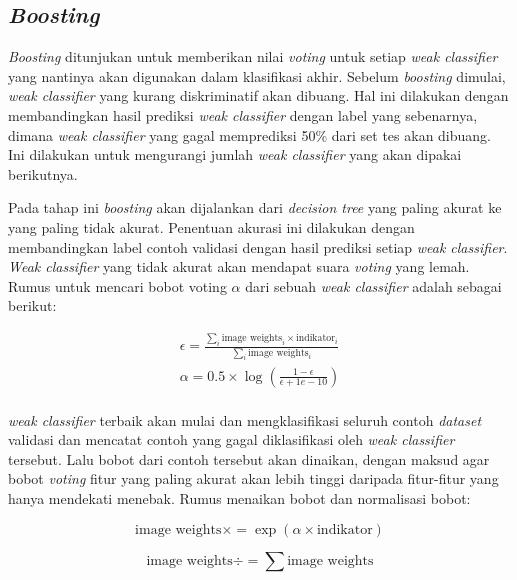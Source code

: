\subsection{\emph{Boosting}}

\emph{Boosting} ditunjukan untuk memberikan nilai \emph{voting} untuk setiap \textit{weak classifier} 
yang nantinya akan digunakan dalam klasifikasi akhir. Sebelum \emph{boosting} dimulai, 
\textit{weak classifier} yang kurang diskriminatif akan dibuang. Hal ini dilakukan dengan 
membandingkan hasil prediksi \textit{weak classifier} dengan label yang sebenarnya, dimana 
\textit{weak classifier} yang gagal memprediksi 50\% dari set tes akan dibuang. Ini dilakukan 
untuk mengurangi jumlah \textit{weak classifier} yang akan dipakai berikutnya.

Pada tahap ini \textit{boosting} 
akan dijalankan dari \textit{decision tree} yang paling akurat ke yang paling tidak akurat. Penentuan 
akurasi ini dilakukan dengan membandingkan label contoh validasi dengan hasil prediksi setiap \textit{weak classifier}. 
\textit{Weak classifier} yang tidak akurat akan mendapat suara \textit{voting} yang lemah. Rumus untuk mencari 
bobot voting \( \alpha \) dari sebuah \textit{weak classifier} adalah sebagai berikut:

\begin{equation}
  \begin{split}
    \epsilon = \frac{\sum_{i} \text{{image weights}}_i \times \text{{indikator}}_i}{\sum_{i} \text{{image weights}}_i} \\
   \alpha = 0.5 \times \log\left(\frac{1 - \epsilon}{\epsilon + 1e-10}\right) \\
  \end{split}
\end{equation}

\emph{weak classifier} terbaik akan mulai dan 
mengklasifikasi seluruh contoh \emph{dataset} validasi dan mencatat contoh yang 
gagal diklasifikasi oleh \emph{weak classifier} tersebut. Lalu bobot dari contoh tersebut akan 
dinaikan, dengan maksud agar bobot \textit{voting} fitur yang paling akurat akan lebih tinggi daripada 
fitur-fitur yang hanya mendekati menebak. Rumus menaikan bobot dan normalisasi bobot:

\begin{equation}
  \text{{image weights}} \times= \exp(\alpha \times \text{{indikator}})
\end{equation}
  
\begin{equation}
  \text{{image weights}} \div= \sum \text{{image weights}}
\end{equation}

